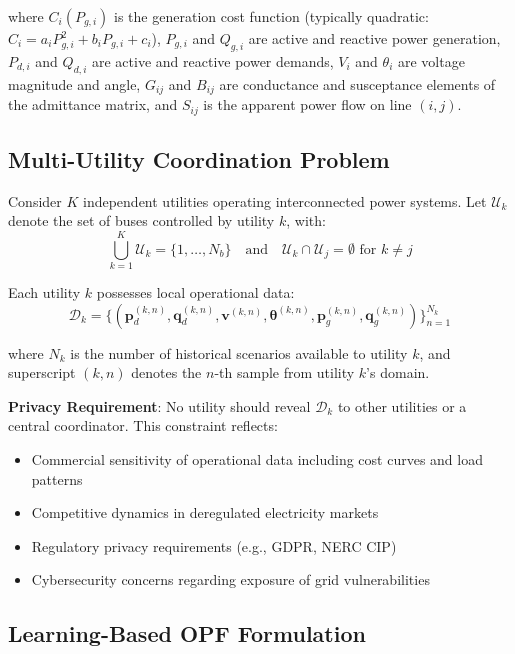 \documentclass[journal,10pt]{IEEEtran}
\begin{document}
where $C_i(P_{g,i})$ is the generation cost function (typically quadratic: $C_i = a_i P_{g,i}^2 + b_i P_{g,i} + c_i$), $P_{g,i}$ and $Q_{g,i}$ are active and reactive power generation, $P_{d,i}$ and $Q_{d,i}$ are active and reactive power demands, $V_i$ and $\theta_i$ are voltage magnitude and angle, $G_{ij}$ and $B_{ij}$ are conductance and susceptance elements of the admittance matrix, and $S_{ij}$ is the apparent power flow on line $(i,j)$.

\subsection{Multi-Utility Coordination Problem}

Consider $K$ independent utilities operating interconnected power systems. Let $\mathcal{U}_k$ denote the set of buses controlled by utility $k$, with:
\begin{equation}
\bigcup_{k=1}^K \mathcal{U}_k = \{1, \ldots, N_b\} \quad \text{and} \quad \mathcal{U}_k \cap \mathcal{U}_j = \emptyset \text{ for } k \neq j
\end{equation}

Each utility $k$ possesses local operational data:
\begin{equation}
\mathcal{D}_k = \{(\mathbf{p}_d^{(k,n)}, \mathbf{q}_d^{(k,n)}, \mathbf{v}^{(k,n)}, \boldsymbol{\theta}^{(k,n)}, \mathbf{p}_g^{(k,n)}, \mathbf{q}_g^{(k,n)})\}_{n=1}^{N_k}
\end{equation}

where $N_k$ is the number of historical scenarios available to utility $k$, and superscript $(k,n)$ denotes the $n$-th sample from utility $k$'s domain.

\textbf{Privacy Requirement}: No utility should reveal $\mathcal{D}_k$ to other utilities or a central coordinator. This constraint reflects:
\begin{itemize}
    \item Commercial sensitivity of operational data including cost curves and load patterns
    \item Competitive dynamics in deregulated electricity markets
    \item Regulatory privacy requirements (e.g., GDPR, NERC CIP)
    \item Cybersecurity concerns regarding exposure of grid vulnerabilities
\end{itemize}

\subsection{Learning-Based OPF Formulation}
\end{document}
